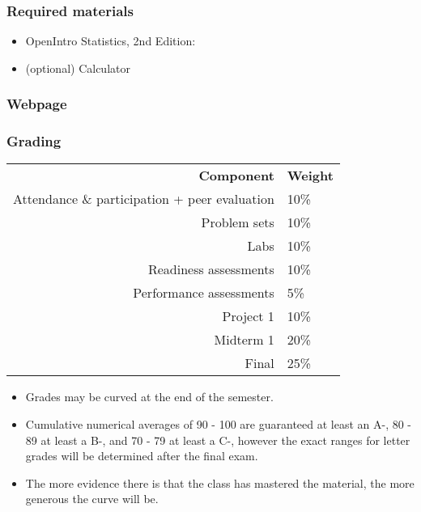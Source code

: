 \documentclass[slidestop,compress,mathserif,12pt,t,professionalfonts,xcolor=table]{beamer}
\begin{document}

\begin{frame}
\frametitle{Required materials}

\begin{itemize}

\item OpenIntro Statistics, 2nd Edition: 

\item (optional) Calculator

\end{itemize}


\end{frame}


\begin{frame}
\frametitle{Webpage}

\vfill

\centering
{\Large 
\webURL{\CourseSite}
}

\vfill

\end{frame}


\begin{frame}
\frametitle{Grading}

\begin{center}
\renewcommand\arraystretch{1.25}
{\scriptsize
\begin{tabular}{ r | l }
\textbf{Component} & \textbf{Weight} \\
Attendance \& participation + peer evaluation	& 10\% \\
Problem sets							& 10\%  \\ 
Labs									& 10\% \\    
Readiness assessments					& 10\%   \\  
Performance assessments 				& 5\%  \\  
Project 1								& 10\% \\   
Midterm 1 							& 20\% \\    
Final 								& 25\%     
\end{tabular}
}
\end{center}

\begin{itemize}

\item Grades may be curved at the end of the semester. 

\item Cumulative numerical averages of 90 - 100 are guaranteed at least an A-, 80 - 89 at least a B-, and 70 - 79 at least a C-, however the exact ranges for letter grades will be determined after the final exam. 

\item The more evidence there is that the class has mastered the material, the more generous the curve will be.

\end{itemize}

\end{frame}
\end{document}
